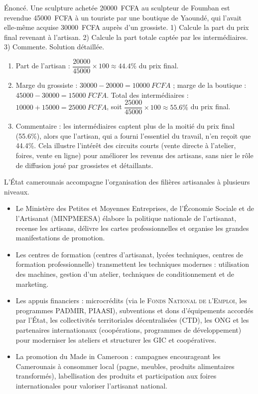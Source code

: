 \documentclass[11pt]{article}
\newcommand{\cle}[1]{{\popxbold\color{popdark}#1}}
\newcounter{popsec}
\newcounter{popsub}
\newcommand{\courssub}[1]{%
  \stepcounter{popsub}%
  \par\vspace{9pt}\noindent{\popxbold\fontsize{11.5}{13}\selectfont\color{popink}{\color{poporange}\thepopsec.\thepopsub}\hspace{6pt}#1}\par\nopagebreak\vspace{4pt}
}
\begin{document}
\begin{exoresolu}
Énoncé. Une sculpture achetée \SI{20000}{FCFA} au sculpteur de Foumban est revendue \SI{45000}{FCFA} à un touriste par une boutique de Yaoundé, qui l'avait elle-même acquise \SI{30000}{FCFA} auprès d'un grossiste. 1) Calcule la part du prix final revenant à l'artisan. 2) Calcule la part totale captée par les intermédiaires. 3) Commente.
\tcblower
Solution détaillée.
\begin{enumerate}
\item Part de l'artisan : $\dfrac{20000}{45000} \times 100 \approx \num{44,4}\%$ du prix final.
\item Marge du grossiste : $30000 - 20000 = \SI{10000}{FCFA}$ ; marge de la boutique : $45000 - 30000 = \SI{15000}{FCFA}$. Total des intermédiaires : $10000 + 15000 = \SI{25000}{FCFA}$, soit $\dfrac{25000}{45000} \times 100 \approx \num{55,6}\%$ du prix final.
\item Commentaire : les intermédiaires captent plus de la moitié du prix final (\num{55,6}\%), alors que l'artisan, qui a fourni l'essentiel du travail, n'en reçoit que \num{44,4}\%. Cela illustre l'intérêt des circuits courts (vente directe à l'atelier, foires, vente en ligne) pour améliorer les revenus des artisans, sans nier le rôle de diffusion joué par grossistes et détaillants.
\end{enumerate}
\end{exoresolu}

\courssub{Le rôle de l'État et des partenaires}

L'État camerounais accompagne l'organisation des filières artisanales à plusieurs niveaux.

\begin{itemize}
\item Le \cle{Ministère des Petites et Moyennes Entreprises, de l'Économie Sociale et de l'Artisanat (MINPMEESA)} élabore la politique nationale de l'artisanat, recense les artisans, délivre les cartes professionnelles et organise les grandes manifestations de promotion.
\item Les \cle{centres de formation} (centres d'artisanat, lycées techniques, centres de formation professionnelle) transmettent les techniques modernes : utilisation des machines, gestion d'un atelier, techniques de conditionnement et de marketing.
\item Les \cle{appuis financiers} : microcrédits (via le \textsc{Fonds National de l'Emploi}, les programmes \textsc{PADMIR}, \textsc{PIAASI}), subventions et dons d'équipements accordés par l'État, les collectivités territoriales décentralisées (CTD), les ONG et les partenaires internationaux (coopérations, programmes de développement) pour moderniser les ateliers et structurer les GIC et coopératives.
\item La promotion du \cle{Made in Cameroon} : campagnes encourageant les Camerounais à consommer local (pagne, meubles, produits alimentaires transformés), labellisation des produits et participation aux foires internationales pour valoriser l'artisanat national.
\end{itemize}
\end{document}
